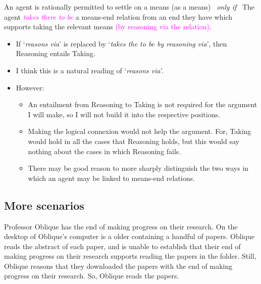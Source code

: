 \documentclass[10pt]{article}
\newenvironment{beamerblock}[1]{%
  \tcolorbox[standard,%
  no shadow,
  noparskip,
  colback=white,
  colframe=black,
  colbacktitle=white,
  coltitle=black,
  colupper=black,
  size=small,
  boxrule=.125mm,
  fonttitle=\bfseries,
  sharp corners=all,
  title=#1]}%
{\endtcolorbox}
\newcommand{\schemaName}[1]{\textsf{#1}}
\begin{document}
\begin{beamerblock}{\schemaName{Taking (by reasoning via)}}
    An agent is rationally permitted to settle on a means (as a means)
    \newline
    \mbox{ }\hfill\emph{only if}\hfill\mbox{ }
    \newline
    The agent \textcolor{fuchsia}{\emph{takes there to be}} a means-end relation from an end they have which supports taking the relevant means \textcolor{fuchsia}{(by reasoning via the relation)}.
  \end{beamerblock}

\begin{itemize}
\item If `\emph{reasons via}' is replaced by `\emph{takes the to be by reasoning via}', then \schemaName{Reasoning} entails \schemaName{Taking}.
\item I think this is a natural reading of `\emph{reasons via}'.
\item However:
  \begin{itemize}
  \item An entailment from \schemaName{Reasoning} to \schemaName{Taking} is not required for the argument I will make, so I will not build it into the respective positions.
  \item Making the logical connexion would not help the argument. For, \schemaName{Taking} would hold in all the cases that \schemaName{Reasoning} holds, but this would say nothing about the cases in which \schemaName{Reasoning} fails.
  \item There may be good reason to more sharply distinguish the two ways in which an agent may be linked to means-end relations.
  \end{itemize}
\end{itemize}

\subsection{More scenarios}
\label{sec:more-scenarios}


\begin{scenario}
  Professor Oblique has the end of making progress on their research.
  On the desktop of Oblique's computer is a older containing a handful of papers.
  Oblique reads the abstract of each paper, and is unable to establish that their end of making progress on their research supports reading the papers in the folder.
  Still, Oblique reasons that they downloaded the papers with the end of making progress on their research.
  So, Oblique reads the papers.
\end{scenario}
\end{document}
